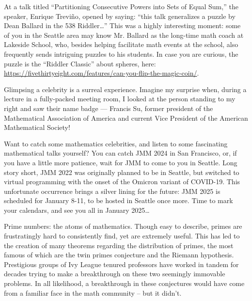 \documentclass{article}
\begin{document}
\begin{multicols}{3}
At a talk titled “Partitioning Consecutive Powers into Sets of Equal Sum,” the speaker, Enrique Treviño, opened by saying: “this talk generalizes a puzzle by Dean Ballard in the 538 Riddler…” This was a highly interesting moment: some of you in the Seattle area may know Mr. Ballard as the long-time math coach at Lakeside School, who, besides helping facilitate math events at the school, also frequently sends intriguing puzzles to his students. In case you are curious, the puzzle is the “Riddler Classic” about spheres, here: \href{https://fivethirtyeight.com/features/can-you-flip-the-magic-coin/}{https://fivethirtyeight.com/features/can-you-flip-the-magic-coin/}. 

Glimpsing a celebrity is a surreal experience. Imagine my surprise when, during a lecture in a fully-packed meeting room, I looked at the person standing to my right and saw their name badge — Francis Su, former president of the Mathematical Association of America and current Vice President of the American Mathematical Society!

Want to catch some mathematics celebrities, and listen to some fascinating mathematical talks yourself? You can catch JMM 2024 in San Francisco, or, if you have a little more patience, wait for JMM to come to you in Seattle. Long story short, JMM 2022 was originally planned to be in Seattle, but switched to virtual programming with the onset of the Omicron variant of COVID-19. This unfortunate occurrence brings a silver lining for the future: JMM 2025 is scheduled for January 8-11, to be hosted in Seattle once more. Time to mark your calendars, and see you all in January 2025…
\closearticle


Prime numbers: the atoms of mathematics. Though easy to describe, primes are frustratingly hard to consistently find, yet are extremely useful. This has led to the creation of many theorems regarding the distribution of primes, the most famous of which are the twin primes conjecture and the Riemann hypothesis. Prestigious groups of Ivy League tenured professors have worked in tandem for decades trying to make a breakthrough on these two seemingly immovable problems. In all likelihood, a breakthrough in these conjectures would have come from a familiar face in the math community – but it didn’t.


\end{multicols}
\end{document}
